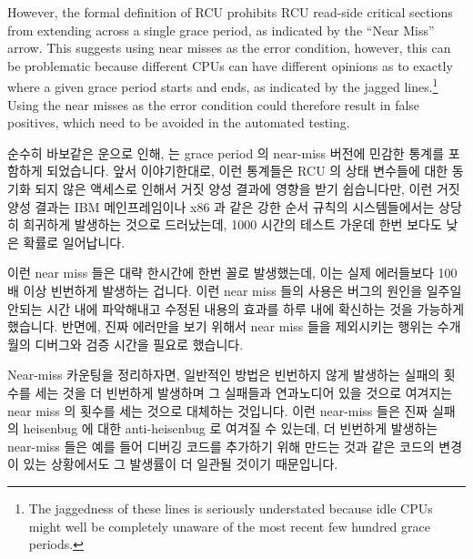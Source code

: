 However, the formal definition of RCU prohibits RCU read-side critical
sections from extending across a single grace period, as indicated by
the ``Near Miss'' arrow.
This suggests using near misses as the error condition, however, this
can be problematic because different CPUs can have different opinions
as to exactly where a given
grace period starts and ends, as indicated by the jagged lines.\footnote{
	The jaggedness of these lines is seriously understated because
	idle CPUs might well be completely unaware of the most recent
	few hundred grace periods.}
Using the near misses as the error condition could therefore result
in false positives, which need to be avoided in the automated
 testing.
\fi

순수히 바보같은 운으로 인해,  는 grace period 의 near-miss
버전에 민감한 통계를 포함하게 되었습니다.
앞서 이야기한대로, 이런 통계들은 RCU 의 상태 변수들에 대한 동기화 되지 않은
액세스로 인해서 거짓 양성 결과에 영향을 받기 쉽습니다만, 이런 거짓 양성 결과는
IBM 메인프레임이나 x86 과 같은 강한 순서 규칙의 시스템들에서는 상당히 희귀하게
발생하는 것으로 드러났는데, 1000 시간의 테스트 가운데 한번 보다도 낮은 확률로
일어납니다.

이런 near miss 들은 대략 한시간에 한번 꼴로 발생했는데, 이는 실제 에러들보다
100배 이상 빈번하게 발생하는 겁니다.
이런 near miss 들의 사용은 버그의 원인을 일주일 안되는 시간 내에 파악해내고
수정된 내용의 효과를 하루 내에 확신하는 것을 가능하게 했습니다.
반면에, 진짜 에러만을 보기 위해서 near miss 들을 제외시키는 행위는 수개월의
디버그와 검증 시간을 필요로 했습니다.

Near-miss 카운팅을 정리하자면, 일반적인 방법은 빈번하지 않게 발생하는 실패의
횟수를 세는 것을 더 빈번하게 발생하며 그 실패들과 연과노디어 있을 것으로
여겨지는 near miss 의 횟수를 세는 것으로 대체하는 것입니다.
이런 near-miss 들은 진짜 실패의 heisenbug 에 대한 anti-heisenbug 로 여겨질 수
있는데, 더 빈번하게 발생하는 near-miss 들은 예를 들어 디버깅 코드를 추가하기
위해 만드는 것과 같은 코드의 변경이 있는 상황에서도 그 발생률이 더 일관될
것이기 때문입니다.

